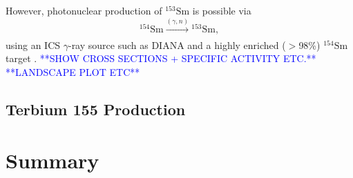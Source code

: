 \documentclass[../main.tex]{subfiles}
\begin{document}
However, photonuclear production of $^{153}\mathrm{Sm}$ is possible via
\begin{equation}
^{154}\mathrm{Sm}\xrightarrow[]{\left(\gamma,n\right)}{}^{153}\mathrm{Sm},
\label{eq:153Sm_photonuclear_production}    
\end{equation}
using an ICS $\gamma$-ray source such as DIANA and a highly enriched ($>$98\%) $^{154}\mathrm{Sm}$ target \cite{bell1987stable,isoflex2021sm}.
\textcolor{blue}{**SHOW CROSS SECTIONS + SPECIFIC ACTIVITY ETC.** \\ **LANDSCAPE PLOT ETC**}

\subsection{Terbium 155 Production}



\section{Summary}
\end{document}
